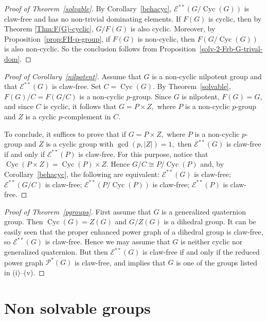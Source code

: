 \documentclass[preprint,11pt]{elsarticle}
\newcommand{\cyc}{\operatorname{Cyc}}
\begin{document}
\begin{proof}[Proof of Theorem~\ref{solvable}]
	By Corollary~\ref{behacyc}, $\mathcal{E}^{**}(G/\cyc(G))$ is claw-free and has no non-trivial dominating elements. If $F(G)$ is cyclic, then by Theorem \ref{Thm:F(G)-cyclic}, $G/F(G)$ is also cyclic. Moreover, by Proposition~\ref{prop:FH-p-group}, if $F(G)$ is non-cyclic, then $F(G/\cyc(G))$ is also non-cyclic. So the conclusion follows from Proposition~\ref{solv-2-Frb-G-trival-dom}.
\end{proof}



	\begin{proof}[Proof of Corollary~\ref{nilpotent}]
		Assume that $G$ is a non-cyclic nilpotent group and that $\mathcal{E}^{**}(G)$ is claw-free. Set $C=\cyc(G).$ By Theorem~\ref{solvable}, $F(G)/C = F(G/C)$ is a non-cyclic $p$-group. Since $G$ is nilpotent, $F(G)=G$, and since $C$ is cyclic, it follows that $G=P \times Z,$ where $P$ is a non-cyclic $p$-group and $Z$ is a cyclic $p$-complement in $C$.
		
		To conclude, it suffices to prove that if $G=P\times Z,$ where $P$ is a non-cyclic $p$-group and $Z$ is a cyclic group with $\gcd(p,|Z|)=1,$ then $\mathcal{E}^{**}(G)$ is claw-free if and only if $\mathcal{E}^{**}(P)$ is claw-free. For this purpose, notice that $\cyc(P\times Z)=\cyc(P)\times Z.$ Hence $G/C\cong P/\cyc(P)$ and, by Corollary~\ref{behacyc}, the following are equivalent: $\mathcal{E}^{**}(G)$ is claw-free; $\mathcal{E}^{**}(G/C)$ is claw-free; $\mathcal{E}^{**}(P/\cyc(P))$ is claw-free; $\mathcal{E}^{**}(P)$ is claw-free.
	\end{proof}
	
	

\begin{proof}[Proof of Theorem~\ref{pgroups}]
	First assume that $G$ is a generalized quaternion group. Then $\cyc(G)=Z(G)$ and $G/Z(G)$ is a dihedral group. It can be easily seen that the proper enhanced power graph of a dihedral group is claw-free, so $\mathcal{E}^{**}(G)$ is claw-free. Hence we may assume that $G$ is neither cyclic nor generalized quaternion. But then
	$\mathcal{E}^{**}(G)$ is claw-free if and only if the reduced power graph $\mathcal P^*(G)$ is claw-free, and  \cite[Proposition 2.5]{claw-free-pwr-graph} implies that $G$ is one of the groups listed in (i)--(v).
\end{proof}


\section{Non solvable groups}
\end{document}
